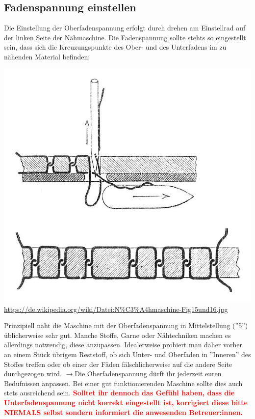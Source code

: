 \documentclass{\basedir/fablab-document}
\newcommand{\pfeil}{\ensuremath{\rightarrow}}
\begin{document}
\subsection{Fadenspannung einstellen}
Die Einstellung der Oberfadenspannung erfolgt durch drehen am Einstellrad auf der linken Seite der Nähmaschine.
Die Fadenspannung sollte stehts so eingestellt sein, dass sich die Kreuzungspunkte des Ober- und des Unterfadens im zu nähenden Material befinden:
\begin{center}
	\includegraphics[width=\linewidth/2]{seam.jpg}
	\url{https://de.wikipedia.org/wiki/Datei:N%C3%A4hmaschine-Fig15und16.jpg}
\end{center}
Prinzipiell näht die Maschine mit der Oberfadenspannung in Mittelstellung (''5'') üblicherweise sehr gut.
Manche Stoffe, Garne oder Nähtechniken machen es allerdings notwendig, diese anzupassen.
Idealerweise probiert man daher vorher an einem Stück übrigem Reststoff, ob sich Unter- und Oberfaden in ''Inneren'' des Stoffes treffen oder ob einer der Fäden fälschlicherweise auf die andere Seite durchgezogen wird.
\newline
\pfeil Die Oberfadenspannung dürft ihr jederzeit euren Bedüfnissen anpassen. Bei einer gut funktionierenden Maschine sollte dies auch stets ausreichend sein. 
\newline
\textcolor{red}{\textbf{Solltet ihr dennoch das Gefühl haben, dass die Unterfadenspannung nicht korrekt eingestellt ist, korrigiert diese bitte NIEMALS selbst sondern informiert die anwesenden Betreuer:innen.}}
\end{document}
